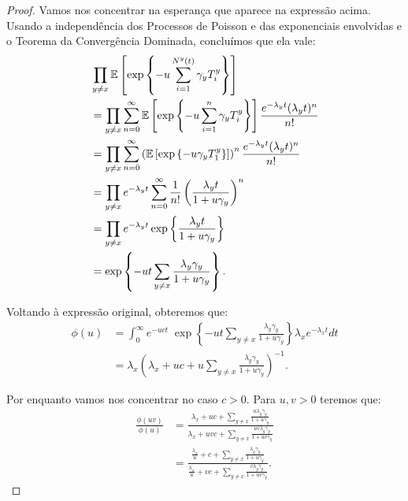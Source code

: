 \begin{proof}
  Vamos nos concentrar na esperança que aparece na expressão
  acima. Usando a independência dos Processos de Poisson e das
  exponenciais envolvidas e o Teorema da Convergência Dominada,
  concluímos que ela vale:
  \begin{align*}
    & \prod_{y \neq x} {\mathbb{E}} \left[ \exp \left\{ -u \sum_{i = 1}^{N^y(t)}
        \gamma_y T^y_i\right\} \right]\\
    &= \prod_{y \neq x} \sum_{n=0}^{\infty} {\mathbb{E}} \left[ \exp \left\{ -u
        \sum_{i = 1}^{n} \gamma_y T^y_i\right\} \right]
    \frac{e^{-\lambda_y
        t}(\lambda_yt)^n}{n!}\\
    &= \prod_{y \neq x} \sum_{n=0}^{\infty} \left( {\mathbb{E}} \left[ \exp
        \left\{ -u \gamma_y T^y_1 \right\} \right] \right)^{n}
    \frac{e^{-\lambda_y t}(\lambda_yt)^n}{n!}\\
    &= \prod_{y \neq x} e^{-\lambda_y t}
    \sum_{n=0}^{\infty} \frac{1}{n!}
    \left(  \frac{\lambda_y t}{1 + u \gamma_y}  \right)^{n}\\
    &= \prod_{y \neq x} e^{-\lambda_y t} \exp \left\{
    \frac{\lambda_y t}{1 + u \gamma_y}  \right\} \\
    &=\exp   \left\{  -u t \sum_{y \neq x} 
      \frac{\lambda_y \gamma_y}{1 + u\gamma_y} \right\}.
  \end{align*}

  Voltando à expressão original, obteremos que:
  \begin{align*}
    \phi(u)
    &= \int_0^\infty
    e^{-u c t} \;
    \exp   \left\{  -u t \sum_{y \neq x} 
      \frac{\lambda_y \gamma_y}{1 + u\gamma_y} \right\}
    \lambda_x e^{-\lambda_x t} d t \\
    &= \lambda_x \left( \lambda_x + uc + u \sum_{y \neq x}
      \frac{\lambda_y \gamma_y}{1 + u\gamma_y} \right)^{-1}.
  \end{align*}

  Por enquanto vamos nos concentrar no caso $c > 0$. Para $u, v > 0$
  teremos que:
  \begin{align*}
    \frac{\phi(uv)}{\phi (u)} &= \frac{\lambda_x + uc + \sum_{y \neq
        x} \frac{u \lambda_y\gamma_y}{1 + u \gamma_y}} {\lambda_x + u
      v c + \sum_{y \neq x} \frac{u v
        \lambda_y\gamma_y}{1 + u v \gamma_y}} \\
    &= \frac{\frac{\lambda_x}{u} + c + \sum_{y \neq x}
      \frac{\lambda_y\gamma_y}{1 + u \gamma_y}} {\frac{\lambda_x}{u} +
      v c + \sum_{y \neq x} \frac{v
        \lambda_y\gamma_y}{1 + u v \gamma_y}}.
  \end{align*}


\end{proof}
